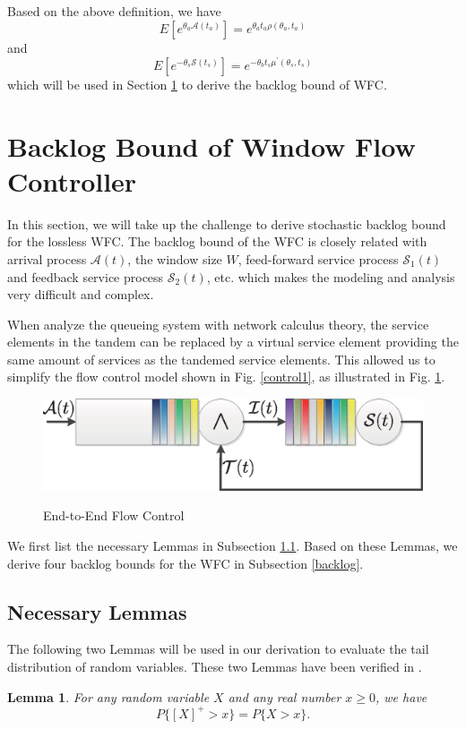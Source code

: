 \documentclass[paper]{ieice}
\newtheorem{lemma}{Lemma}
\begin{document}
Based on the above definition, we have
$$E[e^{\theta_a \mathcal{A}(t_a)}]=e^{\theta_a t_a\rho(\theta_a,t_a)}$$
and
$$E[e^{-\theta_s \mathcal{S}(t_s)}]=e^{-\theta_b t_s\mu^\prime(\theta_s,t_s)}$$
which will be used in Section \ref{sncloss} to derive the backlog bound of WFC.

\section{Backlog Bound of Window Flow Controller}\label{sncloss}
In this section, we will take up the challenge to derive stochastic backlog bound for the lossless WFC. The backlog bound of the WFC is closely related with arrival process $\mathcal{A}(t)$, the window size $W$, feed-forward service process $\mathcal{S}_1(t)$ and feedback service process $\mathcal{S}_2(t)$, etc. which makes the modeling and analysis very difficult and complex.

When analyze the queueing system with network calculus theory, the service elements in the tandem can be replaced by a virtual service element providing the same amount of services as the tandemed service elements. This allowed us to simplify the flow control model shown in Fig. \ref{control1}, as illustrated in Fig. \ref{control2}.
\begin{figure}[ht]
  \centering\includegraphics[scale=0.45]{figures/QueueModel2.eps}\\
  \caption{End-to-End Flow Control}\label{control2}
\end{figure}

We first list the necessary Lemmas in Subsection \ref{neclemma}. Based on these Lemmas, we derive four backlog bounds for the WFC in Subsection \ref{backlog}.
\subsection{Necessary Lemmas}\label{neclemma}
The following two Lemmas will be used in our derivation to evaluate the tail distribution of random variables. These two Lemmas have been verified in \cite{jiang2006basic}.
\begin{lemma}\label{lamma1}
For any random variable $X$ and any real number $x\geq 0$, we have $$P\{[X]^+>x\}=P\{X>x\}.$$
\end{lemma}
\end{document}
